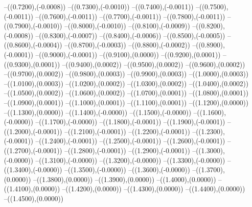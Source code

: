 {	--({\sx*(0.7200)},{\sy*(-0.0008)})
	--({\sx*(0.7300)},{\sy*(-0.0010)})
	--({\sx*(0.7400)},{\sy*(-0.0011)})
	--({\sx*(0.7500)},{\sy*(-0.0011)})
	--({\sx*(0.7600)},{\sy*(-0.0011)})
	--({\sx*(0.7700)},{\sy*(-0.0011)})
	--({\sx*(0.7800)},{\sy*(-0.0011)})
	--({\sx*(0.7900)},{\sy*(-0.0010)})
	--({\sx*(0.8000)},{\sy*(-0.0010)})
	--({\sx*(0.8100)},{\sy*(-0.0009)})
	--({\sx*(0.8200)},{\sy*(-0.0008)})
	--({\sx*(0.8300)},{\sy*(-0.0007)})
	--({\sx*(0.8400)},{\sy*(-0.0006)})
	--({\sx*(0.8500)},{\sy*(-0.0005)})
	--({\sx*(0.8600)},{\sy*(-0.0004)})
	--({\sx*(0.8700)},{\sy*(-0.0003)})
	--({\sx*(0.8800)},{\sy*(-0.0002)})
	--({\sx*(0.8900)},{\sy*(-0.0001)})
	--({\sx*(0.9000)},{\sy*(-0.0001)})
	--({\sx*(0.9100)},{\sy*(0.0000)})
	--({\sx*(0.9200)},{\sy*(0.0001)})
	--({\sx*(0.9300)},{\sy*(0.0001)})
	--({\sx*(0.9400)},{\sy*(0.0002)})
	--({\sx*(0.9500)},{\sy*(0.0002)})
	--({\sx*(0.9600)},{\sy*(0.0002)})
	--({\sx*(0.9700)},{\sy*(0.0002)})
	--({\sx*(0.9800)},{\sy*(0.0003)})
	--({\sx*(0.9900)},{\sy*(0.0003)})
	--({\sx*(1.0000)},{\sy*(0.0003)})
	--({\sx*(1.0100)},{\sy*(0.0003)})
	--({\sx*(1.0200)},{\sy*(0.0002)})
	--({\sx*(1.0300)},{\sy*(0.0002)})
	--({\sx*(1.0400)},{\sy*(0.0002)})
	--({\sx*(1.0500)},{\sy*(0.0002)})
	--({\sx*(1.0600)},{\sy*(0.0002)})
	--({\sx*(1.0700)},{\sy*(0.0001)})
	--({\sx*(1.0800)},{\sy*(0.0001)})
	--({\sx*(1.0900)},{\sy*(0.0001)})
	--({\sx*(1.1000)},{\sy*(0.0001)})
	--({\sx*(1.1100)},{\sy*(0.0001)})
	--({\sx*(1.1200)},{\sy*(0.0000)})
	--({\sx*(1.1300)},{\sy*(0.0000)})
	--({\sx*(1.1400)},{\sy*(-0.0000)})
	--({\sx*(1.1500)},{\sy*(-0.0000)})
	--({\sx*(1.1600)},{\sy*(-0.0000)})
	--({\sx*(1.1700)},{\sy*(-0.0000)})
	--({\sx*(1.1800)},{\sy*(-0.0001)})
	--({\sx*(1.1900)},{\sy*(-0.0001)})
	--({\sx*(1.2000)},{\sy*(-0.0001)})
	--({\sx*(1.2100)},{\sy*(-0.0001)})
	--({\sx*(1.2200)},{\sy*(-0.0001)})
	--({\sx*(1.2300)},{\sy*(-0.0001)})
	--({\sx*(1.2400)},{\sy*(-0.0001)})
	--({\sx*(1.2500)},{\sy*(-0.0001)})
	--({\sx*(1.2600)},{\sy*(-0.0001)})
	--({\sx*(1.2700)},{\sy*(-0.0001)})
	--({\sx*(1.2800)},{\sy*(-0.0001)})
	--({\sx*(1.2900)},{\sy*(-0.0001)})
	--({\sx*(1.3000)},{\sy*(-0.0000)})
	--({\sx*(1.3100)},{\sy*(-0.0000)})
	--({\sx*(1.3200)},{\sy*(-0.0000)})
	--({\sx*(1.3300)},{\sy*(-0.0000)})
	--({\sx*(1.3400)},{\sy*(-0.0000)})
	--({\sx*(1.3500)},{\sy*(-0.0000)})
	--({\sx*(1.3600)},{\sy*(-0.0000)})
	--({\sx*(1.3700)},{\sy*(0.0000)})
	--({\sx*(1.3800)},{\sy*(0.0000)})
	--({\sx*(1.3900)},{\sy*(0.0000)})
	--({\sx*(1.4000)},{\sy*(0.0000)})
	--({\sx*(1.4100)},{\sy*(0.0000)})
	--({\sx*(1.4200)},{\sy*(0.0000)})
	--({\sx*(1.4300)},{\sy*(0.0000)})
	--({\sx*(1.4400)},{\sy*(0.0000)})
	--({\sx*(1.4500)},{\sy*(0.0000)})
}
